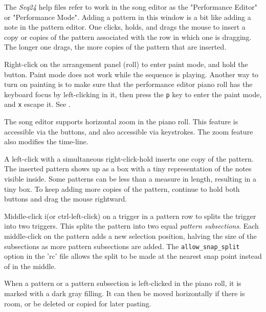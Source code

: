    The \textsl{Seq24} help files refer to work in the song editor as the
   "Performance Editor" or "Performance Mode".  Adding a pattern in this
   window is a bit like adding a note in the pattern editor.
   One clicks, holds, and drags the mouse to insert a copy or copies of the
   pattern associated with the row in which one is dragging.
   The longer one drags, the more copies of the pattern that are inserted.

	Right-click on the arrangement panel (roll) to enter
   paint mode, and hold the button.
   Paint mode does not work while the sequence is playing.
   Another way to turn on painting is to
   make sure that the performance editor piano roll has the
   keyboard focus by left-clicking in it, then press the
   \texttt{p} key to enter the paint mode, and
   \texttt{x} escape it.
   See .

   The song editor supports horizontal zoom in the piano roll.
   This feature is accessible via the buttons, and also
   accessible via keystrokes.
   The zoom feature also modifies the time-line.

   A left-click with a simultaneous right-click-hold inserts one copy of the
   pattern.  The inserted pattern shows up as a box with a tiny
   representation of the notes visible inside.  Some patterns can
   be less than a measure in length, resulting in a tiny box.
   To keep adding more copies of the pattern, continue to hold both buttons
   and drag the mouse rightward.

   Middle-click i(or ctrl-left-click) on a trigger in a pattern row
   to splits the trigger into two triggers.
   This splits the pattern into two equal \textsl{pattern subsections}.
   Each middle-click on the pattern adds a new selection position,
   halving the size of the subsections as more pattern subsections are
   added.  The \texttt{allow\_snap\_split} option in the 'rc' file
   allows the split to be made at the nearest snap point instead of in the
   middle.

   When a pattern or a pattern subsection is left-clicked in the piano
   roll, it is marked with a dark gray filling.
   It can then be moved horizontally if there is room, or be deleted or copied
   for later pasting.

